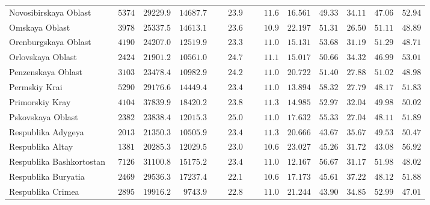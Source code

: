 \documentclass[alpha-refs]{wiley-article-03v}
\begin{document}
{\begin{longtable}{lcccccccccc}
		Novosibirskaya Oblast  & $\phantom{0}5374$ & $29229.9$ & $14687.7$ & $\phantom{000}23.9$ & $\phantom{000}11.6$ & $16.561$ & $49.33$ & $34.11$ & $47.06$ & $52.94$ \\
		Omskaya Oblast  & $\phantom{0}3978$ & $25337.5$ & $14613.1$ & $\phantom{000}23.6$ & $\phantom{000}10.9$ & $22.197$ & $51.31$ & $26.50$ & $51.11$ & $48.89$ \\
		Orenburgskaya Oblast  & $\phantom{0}4190$ & $24207.0$ & $12519.9$ & $\phantom{000}23.3$ & $\phantom{000}11.0$ & $15.131$ & $53.68$ & $31.19$ & $51.29$ & $48.71$ \\
		Orlovskaya Oblast  & $\phantom{0}2424$ & $21901.2$ & $10561.0$ & $\phantom{000}24.7$ & $\phantom{000}11.1$ & $15.017$ & $50.66$ & $34.32$ & $46.99$ & $53.01$ \\
		Penzenskaya Oblast  & $\phantom{0}3103$ & $23478.4$ & $10982.9$ & $\phantom{000}24.2$ & $\phantom{000}11.0$ & $20.722$ & $51.40$ & $27.88$ & $51.02$ & $48.98$ \\
		Permskiy Krai  & $\phantom{0}5290$ & $29176.6$ & $14449.4$ & $\phantom{000}23.4$ & $\phantom{000}11.0$ & $13.894$ & $58.32$ & $27.79$ & $48.17$ & $51.83$ \\
		Primorskiy Kray  & $\phantom{0}4104$ & $37839.9$ & $18420.2$ & $\phantom{000}23.8$ & $\phantom{000}11.3$ & $14.985$ & $52.97$ & $32.04$ & $49.98$ & $50.02$ \\
		Pskovskaya Oblast  & $\phantom{0}2382$ & $23838.4$ & $12015.3$ & $\phantom{000}25.0$ & $\phantom{000}11.0$ & $17.632$ & $55.33$ & $27.04$ & $48.11$ & $51.89$ \\
		Respublika Adygeya  & $\phantom{0}2013$ & $21350.3$ & $10505.9$ & $\phantom{000}23.4$ & $\phantom{000}11.3$ & $20.666$ & $43.67$ & $35.67$ & $49.53$ & $50.47$ \\
		Respublika Altay  & $\phantom{0}1381$ & $20285.3$ & $12029.5$ & $\phantom{000}23.0$ & $\phantom{000}10.6$ & $23.027$ & $45.26$ & $31.72$ & $43.08$ & $56.92$ \\
		Respublika Bashkortostan  & $\phantom{0}7126$ & $31100.8$ & $15175.2$ & $\phantom{000}23.4$ & $\phantom{000}11.0$ & $12.167$ & $56.67$ & $31.17$ & $51.98$ & $48.02$ \\
		Respublika Buryatia  & $\phantom{0}2469$ & $29536.3$ & $17237.4$ & $\phantom{000}22.1$ & $\phantom{000}10.6$ & $17.173$ & $45.61$ & $37.22$ & $48.12$ & $51.88$ \\
		Respublika Crimea  & $\phantom{0}2895$ & $19916.2$ & $\phantom{0}9743.9$ & $\phantom{000}22.8$ & $\phantom{000}11.0$ & $21.244$ & $43.90$ & $34.85$ & $52.99$ & $47.01$ \\

\end{longtable}}
\end{document}
